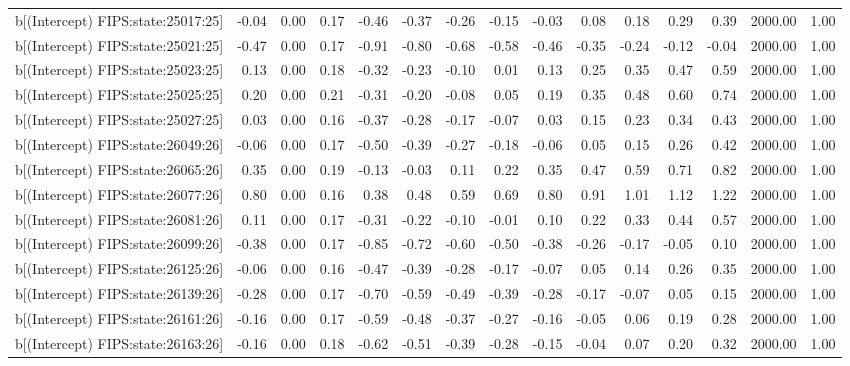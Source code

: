 \begin{table}[ht]
\begin{tabular}{rrrrrrrrrrrrrrr}
  b[(Intercept) FIPS:state:25017:25] & -0.04 & 0.00 & 0.17 & -0.46 & -0.37 & -0.26 & -0.15 & -0.03 & 0.08 & 0.18 & 0.29 & 0.39 & 2000.00 & 1.00 \\ 
  b[(Intercept) FIPS:state:25021:25] & -0.47 & 0.00 & 0.17 & -0.91 & -0.80 & -0.68 & -0.58 & -0.46 & -0.35 & -0.24 & -0.12 & -0.04 & 2000.00 & 1.00 \\ 
  b[(Intercept) FIPS:state:25023:25] & 0.13 & 0.00 & 0.18 & -0.32 & -0.23 & -0.10 & 0.01 & 0.13 & 0.25 & 0.35 & 0.47 & 0.59 & 2000.00 & 1.00 \\ 
  b[(Intercept) FIPS:state:25025:25] & 0.20 & 0.00 & 0.21 & -0.31 & -0.20 & -0.08 & 0.05 & 0.19 & 0.35 & 0.48 & 0.60 & 0.74 & 2000.00 & 1.00 \\ 
  b[(Intercept) FIPS:state:25027:25] & 0.03 & 0.00 & 0.16 & -0.37 & -0.28 & -0.17 & -0.07 & 0.03 & 0.15 & 0.23 & 0.34 & 0.43 & 2000.00 & 1.00 \\ 
  b[(Intercept) FIPS:state:26049:26] & -0.06 & 0.00 & 0.17 & -0.50 & -0.39 & -0.27 & -0.18 & -0.06 & 0.05 & 0.15 & 0.26 & 0.42 & 2000.00 & 1.00 \\ 
  b[(Intercept) FIPS:state:26065:26] & 0.35 & 0.00 & 0.19 & -0.13 & -0.03 & 0.11 & 0.22 & 0.35 & 0.47 & 0.59 & 0.71 & 0.82 & 2000.00 & 1.00 \\ 
  b[(Intercept) FIPS:state:26077:26] & 0.80 & 0.00 & 0.16 & 0.38 & 0.48 & 0.59 & 0.69 & 0.80 & 0.91 & 1.01 & 1.12 & 1.22 & 2000.00 & 1.00 \\ 
  b[(Intercept) FIPS:state:26081:26] & 0.11 & 0.00 & 0.17 & -0.31 & -0.22 & -0.10 & -0.01 & 0.10 & 0.22 & 0.33 & 0.44 & 0.57 & 2000.00 & 1.00 \\ 
  b[(Intercept) FIPS:state:26099:26] & -0.38 & 0.00 & 0.17 & -0.85 & -0.72 & -0.60 & -0.50 & -0.38 & -0.26 & -0.17 & -0.05 & 0.10 & 2000.00 & 1.00 \\ 
  b[(Intercept) FIPS:state:26125:26] & -0.06 & 0.00 & 0.16 & -0.47 & -0.39 & -0.28 & -0.17 & -0.07 & 0.05 & 0.14 & 0.26 & 0.35 & 2000.00 & 1.00 \\ 
  b[(Intercept) FIPS:state:26139:26] & -0.28 & 0.00 & 0.17 & -0.70 & -0.59 & -0.49 & -0.39 & -0.28 & -0.17 & -0.07 & 0.05 & 0.15 & 2000.00 & 1.00 \\ 
  b[(Intercept) FIPS:state:26161:26] & -0.16 & 0.00 & 0.17 & -0.59 & -0.48 & -0.37 & -0.27 & -0.16 & -0.05 & 0.06 & 0.19 & 0.28 & 2000.00 & 1.00 \\ 
  b[(Intercept) FIPS:state:26163:26] & -0.16 & 0.00 & 0.18 & -0.62 & -0.51 & -0.39 & -0.28 & -0.15 & -0.04 & 0.07 & 0.20 & 0.32 & 2000.00 & 1.00 \\ 

\end{tabular}
\end{table}
